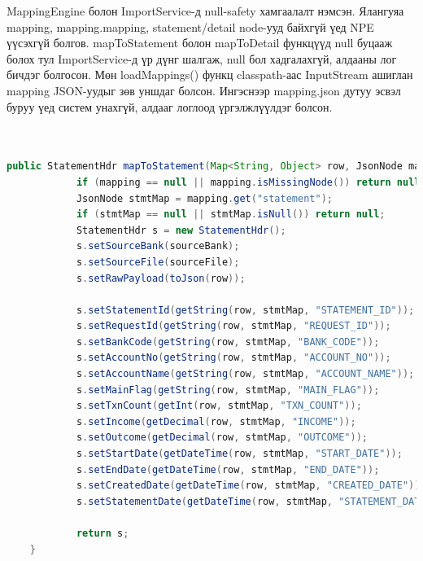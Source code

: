 MappingEngine болон ImportService-д null-safety хамгаалалт нэмсэн. Ялангуяа mapping, mapping.mapping, statement/detail node-ууд байхгүй үед NPE үүсэхгүй болгов. mapToStatement болон mapToDetail функцүүд null буцааж болох тул ImportService-д үр дүнг шалгаж, null бол хадгалахгүй, алдааны лог бичдэг болгосон. Мөн loadMappings() функц classpath-аас InputStream ашиглан mapping JSON-уудыг зөв уншдаг болсон. Ингэснээр mapping.json дутуу эсвэл буруу үед систем унахгүй, алдааг логлоод үргэлжлүүлдэг болсон.\\ \\ \\
\begin{lstlisting}[language=Java, caption=StatementHdr объект үүсгэх, frame=single]
	public StatementHdr mapToStatement(Map<String, Object> row, JsonNode mapping, String sourceBank, String sourceFile) {
			if (mapping == null || mapping.isMissingNode()) return null;
			JsonNode stmtMap = mapping.get("statement");
			if (stmtMap == null || stmtMap.isNull()) return null;
			StatementHdr s = new StatementHdr();
			s.setSourceBank(sourceBank);
			s.setSourceFile(sourceFile);
			s.setRawPayload(toJson(row));

			s.setStatementId(getString(row, stmtMap, "STATEMENT_ID"));
			s.setRequestId(getString(row, stmtMap, "REQUEST_ID"));
			s.setBankCode(getString(row, stmtMap, "BANK_CODE"));
			s.setAccountNo(getString(row, stmtMap, "ACCOUNT_NO"));
			s.setAccountName(getString(row, stmtMap, "ACCOUNT_NAME"));
			s.setMainFlag(getString(row, stmtMap, "MAIN_FLAG"));
			s.setTxnCount(getInt(row, stmtMap, "TXN_COUNT"));
			s.setIncome(getDecimal(row, stmtMap, "INCOME"));
			s.setOutcome(getDecimal(row, stmtMap, "OUTCOME"));
			s.setStartDate(getDateTime(row, stmtMap, "START_DATE"));
			s.setEndDate(getDateTime(row, stmtMap, "END_DATE"));
			s.setCreatedDate(getDateTime(row, stmtMap, "CREATED_DATE"));
			s.setStatementDate(getDateTime(row, stmtMap, "STATEMENT_DATE"));

			return s;
	}
\end{lstlisting}

